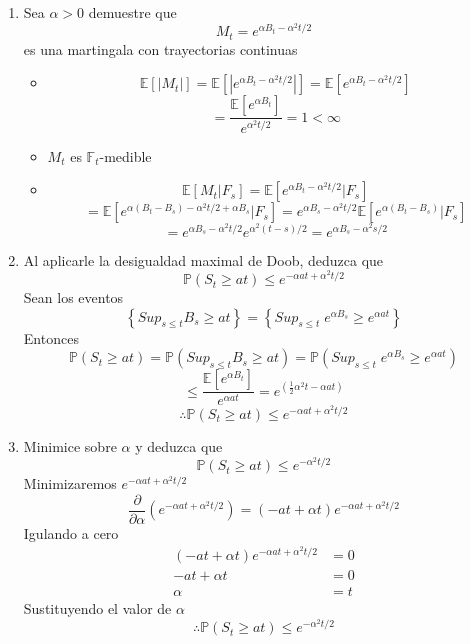 \documentclass[11pt,notitlepage]{article}
\begin{document}
\begin{enumerate}
\item Sea $\alpha > 0$ demuestre que 
        \[M_t= e^{\alpha B_t - \alpha^2 t/2}\]
     es una martingala con trayectorias continuas

\begin{itemize}

\item 
\[\mathbb{E}[\left | M_t \right |]=\mathbb{E}\left [ \left | e^{\alpha B_t - \alpha^2 t/2} \right | \right ]= \mathbb{E}\left [ e^{\alpha B_t - \alpha^2 t/2} \right ]\]
\[=\frac{\mathbb{E}\left [ e^{\alpha B_t} \right ]}{e^{\alpha^2 t/2}} = 1 <\infty\]

\item \(M_t\) es \(\mathbb{F}_t\)-medible
 \item 
 \[\mathbb{E}[ M_t | F_s ]=\mathbb{E} [ e^{\alpha B_t - \alpha^2 t/2} | F_s] \]
\[=\mathbb{E} [ e^{\alpha (B_t-B_s)- \alpha^2 t/2 + \alpha B_s} | F_s] = e^{\alpha B_s- \alpha^2 t/2 } \mathbb{E} [ e^{\alpha (B_t-B_s)} | F_s] \]  
\[= e^{\alpha B_s- \alpha^2 t/2 } e^{\alpha^2 (t- s)/2 }= e^{\alpha B_s- \alpha^2 s/2 } \]  

\end{itemize}
\item   Al aplicarle la desigualdad maximal de Doob, deduzca que   
    \[\mathbb{P}(S_t\geq at) \leq e^{-\alpha at+\alpha^2t/2}\]
Sean los eventos
\[\left \{ Sup_{s\leq t}B_s\geq at \right \}= \left \{ Sup_{ s \leq t}\;e^{\alpha B_s}\geq e^{\alpha at} \right \}\]
Entonces 
\[\mathbb{P}(S_t\geq at)=\mathbb{P}( Sup_{ s \leq t}B_s\geq at )=\mathbb{P}( Sup_{s \leq t}\;e^{\alpha B_s}\geq e^{\alpha at})\]
\[\leq \frac{\mathbb{E}[e^{\alpha B_t}]}{ e^{\alpha at} }=e^{(\frac{1}{2}\alpha^2t-\alpha at)}\]
 \[\therefore \mathbb{P}(S_t\geq at) \leq e^{-\alpha at+\alpha^2t/2}\]

\item Minimice sobre $\alpha$ y deduzca que    \[\mathbb{P}(S_t\geq at) \leq e^{-\alpha^2t/2}\]
Minimizaremos \(e^{-\alpha at+\alpha^2t/2}\)
\[\frac{\partial }{\partial \alpha } (e^{-\alpha at+\alpha^2t/2}) = (-at+\alpha t) e^{-\alpha at+\alpha^2t/2}\]
Igulando a cero
\begin{align*} (-at+\alpha t) e^{-\alpha at+\alpha^2t/2} &= 0\\ -at+\alpha t &= 0\\ \alpha &= t \end{align*}
Sustituyendo el valor de $\alpha$
 \[\therefore \mathbb{P}(S_t\geq at) \leq e^{-\alpha^2t/2}\]
 
\end{enumerate}
\end{document}

